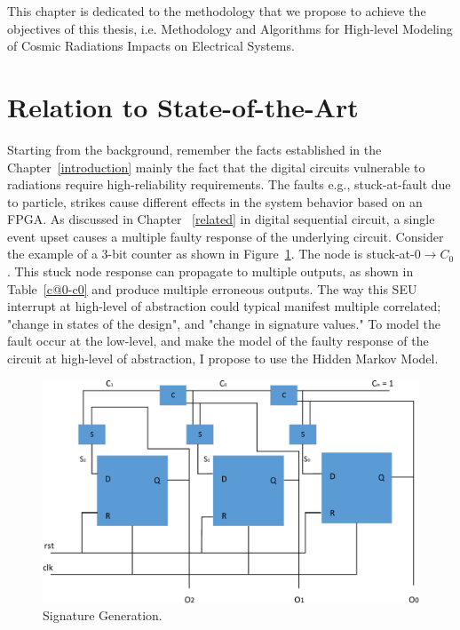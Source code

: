 
This chapter is dedicated to the methodology that we propose to achieve the objectives of this thesis, i.e. Methodology and Algorithms for High-level Modeling of Cosmic Radiations Impacts on Electrical Systems.


\label{approach}
\section{Relation to State-of-the-Art}
Starting from the background, remember the facts established in the Chapter~\ref{introduction} mainly the fact that the digital circuits vulnerable to radiations require high-reliability requirements. The faults e.g., stuck-at-fault due to particle, strikes cause different effects in the system behavior based on an FPGA. As discussed in Chapter ~\ref{related} in digital sequential circuit, a single event upset causes a multiple faulty response of the underlying circuit. Consider the example of  a 3-bit counter as shown in Figure~\ref{fig:counter}. The node is stuck-at-0$\rightarrow C_0$. This stuck node response can propagate to multiple outputs, as shown in Table~\ref{c@0-c0} and produce multiple erroneous outputs. The way this SEU interrupt at high-level of abstraction could typical manifest multiple correlated; "change in states of the design", and "change in signature values." To model the fault occur at the low-level, and make the model of the faulty response of the circuit at high-level of abstraction, I propose to use the Hidden Markov Model. 



\begin{figure}[tb!]

 \centering
  \captionsetup{justification=centering}    
   \includegraphics[scale=0.6]{Figures/counter.pdf}
   \caption{Signature Generation.}
\label{fig:counter}
\end{figure}

